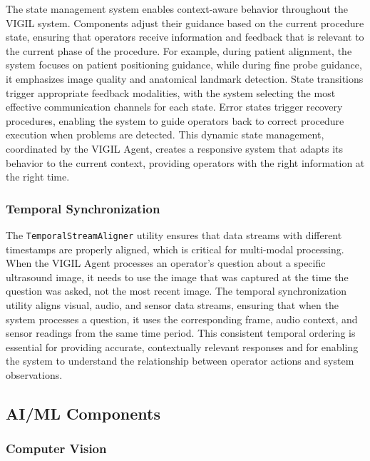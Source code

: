 \documentclass[12pt,a4paper]{article}
\begin{document}
The state management system enables context-aware behavior throughout the VIGIL system. Components adjust their guidance based on the current procedure state, ensuring that operators receive information and feedback that is relevant to the current phase of the procedure. For example, during patient alignment, the system focuses on patient positioning guidance, while during fine probe guidance, it emphasizes image quality and anatomical landmark detection. State transitions trigger appropriate feedback modalities, with the system selecting the most effective communication channels for each state. Error states trigger recovery procedures, enabling the system to guide operators back to correct procedure execution when problems are detected. This dynamic state management, coordinated by the VIGIL Agent, creates a responsive system that adapts its behavior to the current context, providing operators with the right information at the right time.

\subsubsection{Temporal Synchronization}

The \texttt{TemporalStreamAligner} utility ensures that data streams with different timestamps are properly aligned, which is critical for multi-modal processing. When the VIGIL Agent processes an operator's question about a specific ultrasound image, it needs to use the image that was captured at the time the question was asked, not the most recent image. The temporal synchronization utility aligns visual, audio, and sensor data streams, ensuring that when the system processes a question, it uses the corresponding frame, audio context, and sensor readings from the same time period. This consistent temporal ordering is essential for providing accurate, contextually relevant responses and for enabling the system to understand the relationship between operator actions and system observations.

\subsection{AI/ML Components}

\subsubsection{Computer Vision}
\end{document}
